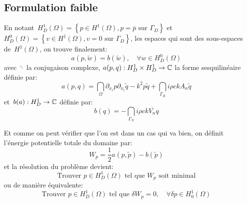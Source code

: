 \subsection{Formulation faible}
En notant~$H^1_D(\Omega)=\left\{p\in H^1(\Omega), p=\overline{p} \text{ sur } \Gamma_D\right\}$ et $H^0_D(\Omega)=\left\{v\in H^1(\Omega), v=0 \text{ sur } \Gamma_D\right\}$, les espaces qui sont des sous-espaces de~$H^1(\Omega)$, on trouve finalement:
\begin{equation}a(p,\tilde{w})=b(\tilde{w}), \quad \forall w\in H^0_D(\Omega)\end{equation}
avec~$\tilde{\cdot}$ la conjugaison complexe, $a(p,q): H^1_D\times H^1_D \rightarrow \mathbb C$ la forme sesquilinéaire définie par:
\begin{equation}a(p,q)=\dint_\Omega \partial_{x_i}p\partial_{x_i}\tilde{q}-k^2p\tilde{q} +
\dint_{\Gamma_R} i\rho ckA_n\tilde{q}
\end{equation}
et~$b(a): H^1_D\rightarrow\mathbb C$ définie par:
\begin{equation}b(q)=-\dint_{\Gamma_N} i\rho c k\overline{V_n} q\end{equation}

\medskip
Et comme on peut vérifier que l'on est dans un cas qui va bien, on définit l'énergie potentielle totale du domaine par:
\begin{equation}W_p=\frac12 a(p,\tilde{p})-b(\tilde{p})\end{equation}
et la résolution du problème devient:
\begin{equation}
\text{Trouver } p\in H^1_D(\Omega) \text{ tel que } W_p \text{ soit minimal}
\end{equation}
ou de manière équivalente:
\begin{equation}
\text{Trouver } p\in H^1_D(\Omega) \text{ tel que } \delta W_p=0,\quad \forall\delta p\in H^1_0(\Omega)
\end{equation} 
